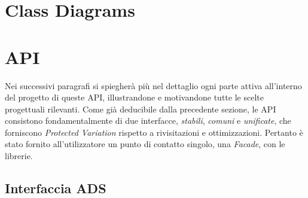 \section{Class Diagrams}


%

\section{API}

%	
%	

	Nei successivi paragrafi si spiegherà più nel dettaglio ogni parte attiva all'interno del progetto di queste API, illustrandone e motivandone tutte le scelte progettuali rilevanti.
	Come già deducibile dalla precedente sezione, le API consistono fondamentalmente di due interfacce, \textit{stabili}, \textit{comuni} e \textit{unificate}, che forniscono \textit{Protected Variation} rispetto a rivisitazioni e ottimizzazioni. Pertanto è stato fornito  all'utilizzatore un punto di contatto singolo, una \textit{Facade}, con le librerie.
	
	
	\subsection{Interfaccia ADS}
	
